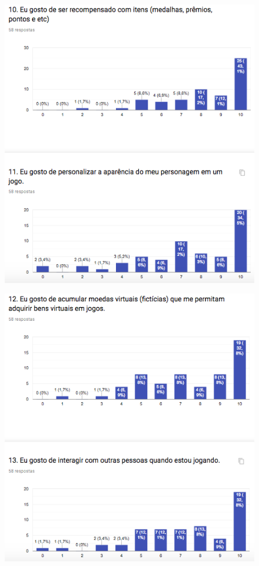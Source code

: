 \begin{apendicesenv}
\begin{figure}[h]
	\centering
	\includegraphics[keepaspectratio=true,scale=1]{figuras/r11.png}
\end{figure}

\begin{figure}[h]
	\centering
	\includegraphics[keepaspectratio=true,scale=1]{figuras/r12.png}
\end{figure}



\end{apendicesenv}
